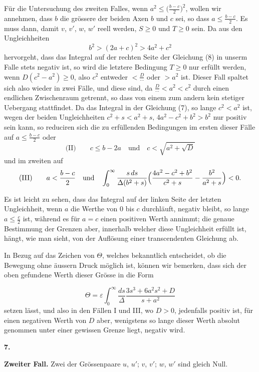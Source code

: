 \documentclass[12pt,a4paper]{book}
\theoremstyle{definition}
\theoremstyle{remark}
\begin{document}
F\"ur die Untersuchung des zweiten Falles, wenn $a^{2} \leq \bigl(\frac{b-c}{2}\bigr)^{2}$, wollen wir annehmen, dass $b$ die gr\"ossere der beiden Axen $b$ und $c$ sei, so dass $a \leq \frac{b-c}{2}$. Es muss dann, damit $v$, $v'$, $w$, $w'$ reell werden, $S \geq 0$ und $T \geq 0$ sein. Da aus den Ungleichheiten
\[
b^{2} > (2a+c)^{2} > 4a^{2} + c^{2}
\]
hervorgeht, dass das Integral auf der rechten Seite der Gleichung (8) in unserm Falle stets negativ ist, so wird die letztere Bedingung $T \geq 0$ nur erf\"ullt werden, wenn $D(c^{2} - a^{2}) \geq 0$, also $c^{2}$ entweder $< \frac{D}{\cdots}$ oder $> a^{2}$ ist. Dieser Fall spaltet sich also wieder in zwei F\"alle, und diese sind, da $\frac{D}{\cdots} < a^{2} < c^{2}$ durch einen endlichen Zwischenraum getrennt, so dass von einem zum andern kein stetiger Uebergang stattfindet. Da das Integral in der Gleichung (7), so lange $c^{2} < a^{2}$ ist, wegen der beiden Ungleichheiten $c^{2} + s < a^{2} + s$, $4a^{2} - c^{2} + b^{2} > b^{2}$ nur positiv sein kann, so reduciren sich die zu erf\"ullenden Bedingungen im ersten dieser F\"alle auf $a \leq \frac{b-c}{2}$ oder
\[
\text{(II)}\qquad c \leq b - 2a\quad\text{und}\quad c < \sqrt{a^{2} + \sqrt{D}}
\]
und im zweiten auf
\[
\text{(III)}\qquad a < \frac{b-c}{2}\quad\text{und}\quad\int_{0}^{\infty}\frac{s\,ds}{\Delta(b^{2}+s)}\Bigl(\frac{4a^{2}-c^{2}+b^{2}}{c^{2}+s} - \frac{b^{2}}{a^{2}+s}\Bigr) < 0.
\]

Es ist leicht zu sehen, dass das Integral auf der linken Seite der letzten Ungleichheit, wenn $a$ die Werthe von $0$ bis $c$ durchl\"auft, negativ bleibt, so lange $a \leq \frac{c}{2}$ ist, w\"ahrend es f\"ur $a = c$ einen positiven Werth annimmt; die genaue Bestimmung der Grenzen aber, innerhalb welcher diese Ungleichheit erf\"ullt ist, h\"angt, wie man sieht, von der Aufl\"osung einer transcendenten Gleichung ab.

In Bezug auf das Zeichen von $\Theta$, welches bekanntlich entscheidet, ob die Bewegung ohne \"aussern Druck m\"oglich ist, k\"onnen wir bemerken, dass sich der oben gefundene Werth dieser Gr\"osse in die Form

\[
\Theta = \varepsilon\int_{0}^{\infty}\frac{ds}{\Delta}\frac{3s^{3} + 6a^{2}s^{2} + D}{s + a^{2}}
\]
setzen l\"asst, und also in den F\"allen I und III, wo $D > 0$, jedenfalls positiv ist, f\"ur einen negativen Werth von $D$ aber, wenigstens so lange dieser Werth absolut genommen unter einer gewissen Grenze liegt, negativ wird.

\begin{center}
\textbf{7.}
\end{center}
\begin{center}
\textbf{Zweiter Fall.} Zwei der Gr\"ossenpaare $u$, $u'$; $v$, $v'$; $w$, $w'$ sind gleich Null.
\end{center}
\end{document}
